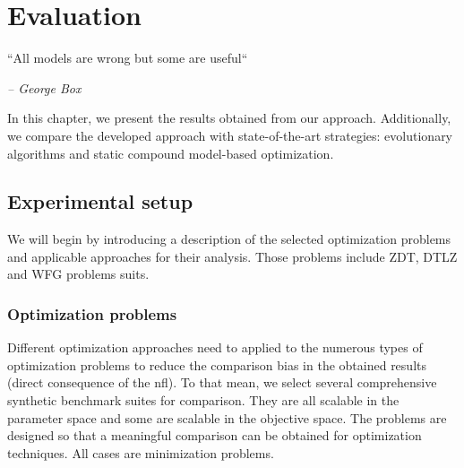 \chapter{Evaluation}\label{sec:evaluation}

\epigraph{``All models are wrong but some are useful``}{\textit{– George Box}}

In this chapter, we present the results obtained from our approach. Additionally, we compare the developed approach with state-of-the-art strategies: evolutionary algorithms and static compound model-based optimization.


\section{Experimental setup}
    We will begin by introducing a description of the selected optimization problems and applicable approaches for their analysis. Those problems include ZDT, DTLZ and WFG problems suits. 

    \subsection{Optimization problems}
    Different optimization approaches need to applied to the numerous types of optimization problems to reduce the comparison bias in the obtained results (direct consequence of the \gls{nfl}). To that mean, we select several comprehensive synthetic benchmark suites for comparison. They are all scalable in the parameter space and some are scalable in the objective space. The problems are designed so that a meaningful comparison can be obtained for optimization techniques. All cases are minimization problems.

